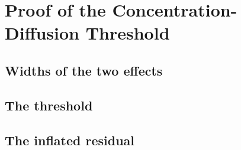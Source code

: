 
\section{Proof of the Concentration-Diffusion Threshold}
\label{p3:apx:threshold}

\subsection{Widths of the two effects}
\label{p3:sub:apx_two_widths}

\subsection{The threshold}
\label{p3:sub:apx_threshold_statement}

\subsection{The inflated residual}
\label{p3:sub:apx_inflated_residual}
